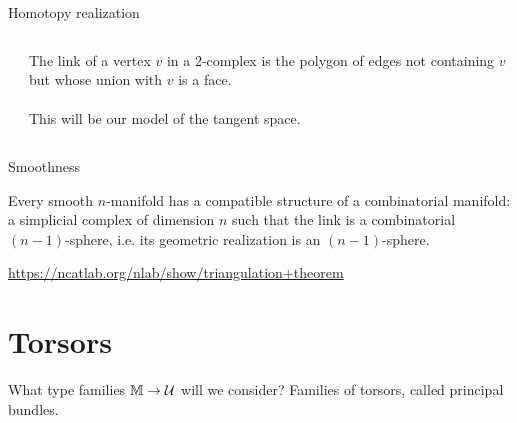 \documentclass[14pt,aspectratio=169]{beamer}
\renewcommand{\defemph}[1]{\alert{#1}}
\begin{document}



\begin{frame}{Homotopy realization}
\begin{columns}
\begin{column}{0.5\textwidth}

\end{column}
\begin{column}{0.5\textwidth}
The \defemph{link} of a vertex \( v \) in a 2-complex is the polygon of edges not containing \( v \) but whose union with \( v \) is a face.\\~\\

This will be our model of the \alert{tangent space}.
\end{column}
\end{columns}
\end{frame}

\begin{frame}{Smoothness}
\begin{theorem}[Whitehead (1940)]
Every smooth \( n \)-manifold has a compatible structure of a \alert{combinatorial manifold}: a simplicial complex of dimension \( n \) such that the link is a combinatorial \( (n-1) \)-sphere, i.e. its geometric realization is an \( (n-1) \)-sphere.
\end{theorem}
\url{https://ncatlab.org/nlab/show/triangulation+theorem}
\end{frame}

\section{Torsors}

\begin{frame}
What type families \( \mathbb{M}\to\mathcal{U} \) will we consider? Families of torsors, called \alert{principal bundles}.
\end{frame}
\end{document}
